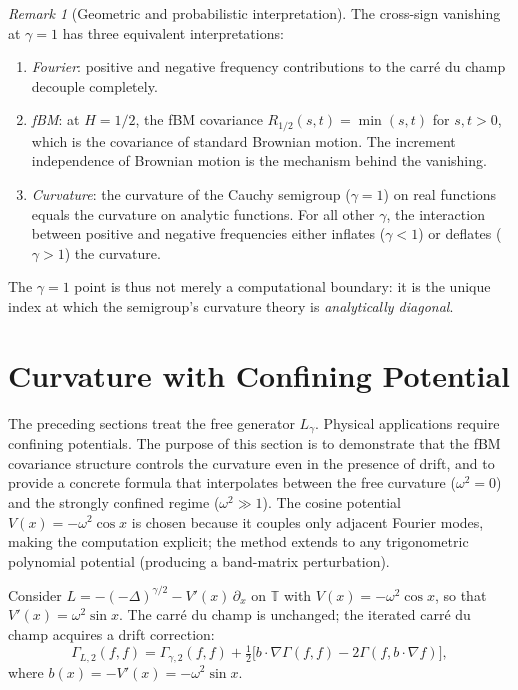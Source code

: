 \documentclass[11pt,a4paper]{article}
\theoremstyle{plain}
\theoremstyle{definition}
\theoremstyle{remark}
\newtheorem{remark}[theorem]{Remark}
\newcommand{\T}{\mathbb{T}}
\begin{document}
\begin{remark}[Geometric and probabilistic interpretation]
\label{rem:geometric}
The cross-sign vanishing at $\gamma = 1$ has three
equivalent interpretations:
\begin{enumerate}[label=(\alph*)]
\item \emph{Fourier}: positive and negative frequency
  contributions to the carr\'e du champ decouple
  completely.
\item \emph{fBM}: at $H = 1/2$, the fBM covariance
  $R_{1/2}(s,t) = \min(s,t)$ for $s,t > 0$, which is
  the covariance of standard Brownian motion.  The
  increment independence of Brownian motion is the
  mechanism behind the vanishing.
\item \emph{Curvature}: the curvature of the Cauchy
  semigroup ($\gamma = 1$) on real functions equals
  the curvature on analytic functions.  For all other
  $\gamma$, the interaction between positive and
  negative frequencies either inflates ($\gamma < 1$)
  or deflates ($\gamma > 1$) the curvature.
\end{enumerate}
The $\gamma = 1$ point is thus not merely a
computational boundary: it is the unique index at
which the semigroup's curvature theory is
\emph{analytically diagonal}.
\end{remark}


\section{Curvature with Confining Potential}\label{sec:potential}

The preceding sections treat the free generator $L_\gamma$.
Physical applications require confining potentials.  The
purpose of this section is to demonstrate that the fBM
covariance structure controls the curvature even in the
presence of drift, and to provide a concrete formula
that interpolates between the free curvature ($\omega^2=0$)
and the strongly confined regime ($\omega^2 \gg 1$).
The cosine potential $V(x) = -\omega^2\cos x$ is chosen
because it couples only adjacent Fourier modes, making the
computation explicit; the method extends to any
trigonometric polynomial potential
(producing a band-matrix perturbation).

Consider $L = -(-\Delta)^{\gamma/2} - V'(x)\,\partial_x$ on $\T$
with $V(x) = -\omega^2\cos x$, so that
$V'(x) = \omega^2\sin x$. The carr\'e du champ is unchanged;
the iterated carr\'e du champ acquires a drift correction:
\begin{equation}\label{eq:G2-drift}
  \Gamma_{L,2}(f,f) = \Gamma_{\gamma,2}(f,f)
  + \tfrac{1}{2}\bigl[
    b \cdot \nabla\Gamma(f,f) - 2\Gamma(f, b \cdot \nabla f)
  \bigr],
\end{equation}
where $b(x) = -V'(x) = -\omega^2\sin x$.
\end{document}
